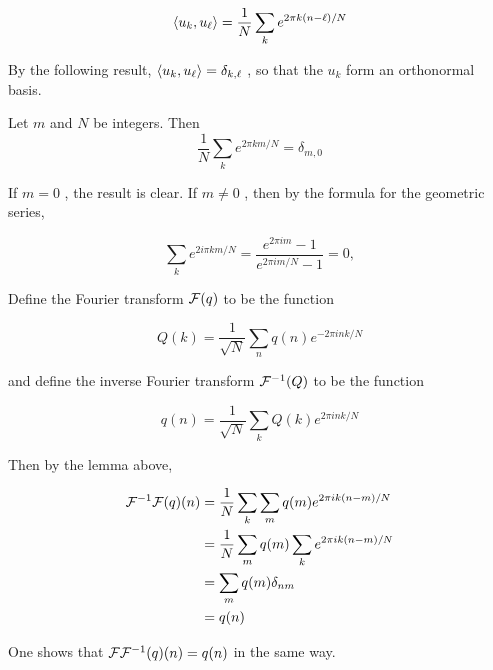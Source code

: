 \begin{equation}
\langle u_k, u_\ell \rangle
 =
\frac{1}{N}\sum_k e^{2\pi k(n-\ell)/N}
\end{equation}


By  the  following  result,   $\langle u_k, u_\ell \rangle = \delta_{k, \ell}$ ,  so  that  the   $u_k$  form  an  orthonormal  basis.



\begin{lemma}
Let   $m$  and   $N$  be  integers.  Then
 $$
\frac{1}{N}\sum_k e^{2\pi km/N} = \delta_{m,0}
$$
\end{lemma}


  If   $m = 0$ ,  the  result  is  clear.   If   $m \ne 0$ ,  then  by  the  formula  for  the  geometric  series,



\begin{equation}
\sum_k e^{2i\pi km/N} = \frac{e^{2\pi im} - 1}{e^{2\pi im/N} - 1} =0,
\end{equation}



Define  the  Fourier  transform   $\mathcal{F}(q)$  to  be  the  function



\begin{equation}
Q(k) = \frac{1}{\sqrt N} \sum_n q(n)e^{-2\pi i nk/N}
\end{equation}


and  define  the  inverse  Fourier  transform   $\mathcal{F}^{-1}(Q)$  to  be  the  function



\begin{equation}
q(n) = \frac{1}{\sqrt N} \sum_k Q(k)e^{2\pi i nk/N}
\end{equation}


Then  by  the  lemma  above,



\begin{align}
\mathcal{F}^{-1}\mathcal{F}(q)(n) &=
\frac{1}{N} \sum_k \sum_m q(m) e^{2\pi ik(n - m)/N} \\
&=
\frac{1}{N} \sum_m q(m) \sum_k  e^{2\pi ik(n - m)/N} \\
&= \sum_m q(m)\delta_{nm} \\
&= q(n)
\end{align}


One  shows  that   $\mathcal{F}\mathcal{F}^{-1}(q)(n) = q(n)$  in  the  same  way.



